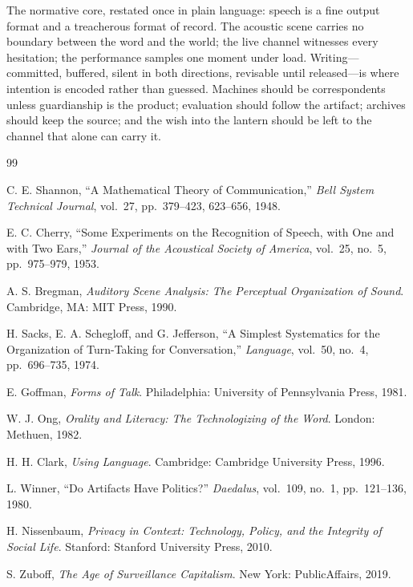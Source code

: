 \documentclass[11pt,oneside]{book}
\theoremstyle{plain}
\theoremstyle{definition}
\theoremstyle{remark}
\begin{document}
The normative core, restated once in plain language: speech is a fine output format and a treacherous format of record. The acoustic scene carries no boundary between the word and the world; the live channel witnesses every hesitation; the performance samples one moment under load. Writing---committed, buffered, silent in both directions, revisable until released---is where intention is encoded rather than guessed. Machines should be correspondents unless guardianship is the product; evaluation should follow the artifact; archives should keep the source; and the wish into the lantern should be left to the channel that alone can carry it.

\backmatter
\cleardoublepage
{}

\begin{thebibliography}{99}

 C. E. Shannon, ``A Mathematical Theory of Communication,'' \emph{Bell System Technical Journal}, vol.~27, pp.~379--423, 623--656, 1948.

 E. C. Cherry, ``Some Experiments on the Recognition of Speech, with One and with Two Ears,'' \emph{Journal of the Acoustical Society of America}, vol.~25, no.~5, pp.~975--979, 1953.

 A. S. Bregman, \emph{Auditory Scene Analysis: The Perceptual Organization of Sound}. Cambridge, MA: MIT Press, 1990.

 H. Sacks, E. A. Schegloff, and G. Jefferson, ``A Simplest Systematics for the Organization of Turn-Taking for Conversation,'' \emph{Language}, vol.~50, no.~4, pp.~696--735, 1974.

 E. Goffman, \emph{Forms of Talk}. Philadelphia: University of Pennsylvania Press, 1981.

 W. J. Ong, \emph{Orality and Literacy: The Technologizing of the Word}. London: Methuen, 1982.

 H. H. Clark, \emph{Using Language}. Cambridge: Cambridge University Press, 1996.

 L. Winner, ``Do Artifacts Have Politics?'' \emph{Daedalus}, vol.~109, no.~1, pp.~121--136, 1980.

 H. Nissenbaum, \emph{Privacy in Context: Technology, Policy, and the Integrity of Social Life}. Stanford: Stanford University Press, 2010.

 S. Zuboff, \emph{The Age of Surveillance Capitalism}. New York: PublicAffairs, 2019.


\end{thebibliography}
\end{document}
